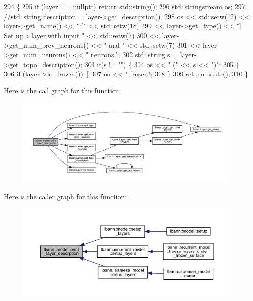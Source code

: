\begin{DoxyCode}
294                                                                  \{
295   \textcolor{keywordflow}{if} (layer == \textcolor{keyword}{nullptr}) \textcolor{keywordflow}{return} std::string();
296   std::stringstream os;
297   \textcolor{comment}{//std::string description = layer->get\_description();}
298   os << std::setw(12) << layer->get\_name() << \textcolor{stringliteral}{":["} << std::setw(18)
299      << layer->get\_type() <<  \textcolor{stringliteral}{"] Set up a layer with input "} << std::setw(7)
300      << layer->get\_num\_prev\_neurons() << \textcolor{stringliteral}{" and "} << std::setw(7)
301      << layer->get\_num\_neurons() << \textcolor{stringliteral}{" neurons."};
302   std::string s = layer->get\_topo\_description();
303   \textcolor{keywordflow}{if}(s != \textcolor{stringliteral}{""}) \{
304     os << \textcolor{stringliteral}{" ("} << s << \textcolor{stringliteral}{")"};
305   \}
306   \textcolor{keywordflow}{if} (layer->is\_frozen()) \{
307     os << \textcolor{stringliteral}{" frozen"};
308   \}
309   \textcolor{keywordflow}{return} os.str();
310 \}
\end{DoxyCode}
Here is the call graph for this function\+:\nopagebreak
\begin{figure}[H]
\begin{center}
\leavevmode
\includegraphics[width=350pt]{classlbann_1_1model_ab173fd93a80a2980059ff292c308cbf5_cgraph}
\end{center}
\end{figure}
Here is the caller graph for this function\+:\nopagebreak
\begin{figure}[H]
\begin{center}
\leavevmode
\includegraphics[width=350pt]{classlbann_1_1model_ab173fd93a80a2980059ff292c308cbf5_icgraph}
\end{center}
\end{figure}
\mbox{\label{classlbann_1_1model_ac6cc0f5d850cfb997bbbc70eefa0d68f}} 

